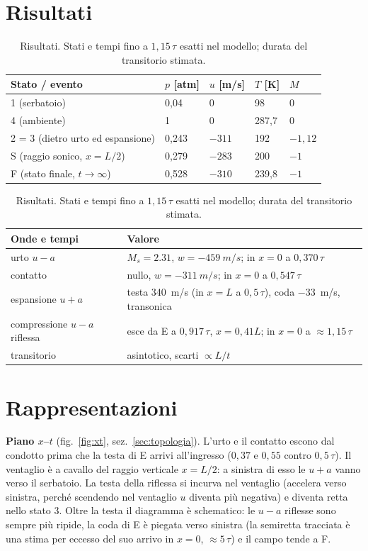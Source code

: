 \documentclass[11pt,a4paper]{article}
\newcommand{\uma}{u-a}
\newcommand{\upa}{u+a}
\newcommand{\Ms}{M_{s}}
\begin{document}
\section{Risultati}
\begin{table}[H]
  \centering
  \small
  \begin{tabular}{lllll}
    \toprule
    Stato / evento & $p$ [atm] & $u$ [m/s] & $T$ [K] & $M$ \\
    \midrule
    1 (serbatoio) & 0,04 & 0 & 98 & 0 \\
    4 (ambiente) & 1 & 0 & 287,7 & 0 \\
    2 = 3 (dietro urto ed espansione) & 0,243 & $-311$ & 192 & $-1{,}12$ \\
    S (raggio sonico, $x=L/2$) & 0,279 & $-283$ & 200 & $-1$ \\
    F (stato finale, $t\to\infty$) & 0,528 & $-310$ & 239,8 & $-1$ \\
    \bottomrule
  \end{tabular}

  \vspace{4pt}
  \begin{tabular}{ll}
    \toprule
    Onde e tempi & Valore \\
    \midrule
    urto $\uma$ & $\Ms=\num{2.31}$, $w=\SI{-459}{m/s}$; in $x=0$ a $0{,}370\,\tau$ \\
    contatto & nullo, $w=\SI{-311}{m/s}$; in $x=0$ a $0{,}547\,\tau$ \\
    espansione $\upa$ & testa \SI{340}{m/s} (in $x=L$ a $0{,}5\,\tau$), coda \SI{-33}{m/s}, transonica \\
    compressione $\uma$ riflessa & esce da E a $0{,}917\,\tau$, $x=0{,}41L$; in $x=0$ a $\approx1{,}15\,\tau$ \\
    transitorio & asintotico, scarti $\propto L/t$ \\
    \bottomrule
  \end{tabular}
  \caption{Risultati. Stati e tempi fino a $1{,}15\,\tau$ esatti nel modello; durata del transitorio stimata.}
\end{table}

\section{Rappresentazioni}
\label{sec:rappr}
\textbf{Piano $x$--$t$} (fig.~\ref{fig:xt}, sez.~\ref{sec:topologia}). L'urto e il contatto escono dal condotto
prima che la testa di E arrivi all'ingresso ($0{,}37$ e $0{,}55$ contro $0{,}5\,\tau$). Il ventaglio è a cavallo del
raggio verticale $x=L/2$: a sinistra di esso le $\upa$ vanno verso il serbatoio. La testa della riflessa si incurva
nel ventaglio (accelera verso sinistra, perché scendendo nel ventaglio $u$ diventa più negativa) e diventa retta
nello stato 3. Oltre la testa il diagramma è
schematico: le $\uma$ riflesse sono sempre più ripide, la coda di E è piegata verso sinistra (la semiretta tracciata
è una stima per eccesso del suo arrivo in $x=0$, $\approx5\,\tau$) e il campo tende a F.
\end{document}
